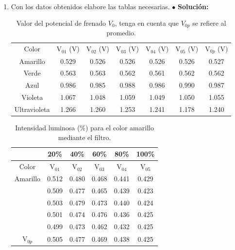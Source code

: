 \documentclass{article}
\begin{document}
\begin{enumerate}
    \item Con los datos obtenidos elabore las tablas necesarias.\newline
$\bullet$ \textbf{Solución: }

\begin{table}[h!]
    \centering
    \begin{tabular}{|c|c|c|c|c|c|c|}
    \hline
       Color  &  V$_{01}$ (V) & V$_{02}$ (V) & V$_{03}$ (V) & V$_{04}$ (V) & V$_{05}$ (V) & V$_{0p}$ (V)\\
       Amarillo  & 0.529 & 0.526 & 0.526 & 0.526 & 0.526 & 0.527 \\
       \hline
       Verde  & 0.563 & 0.563 & 0.562 & 0.561 & 0.562 & 0.562 \\
       \hline
       Azul  & 0.986 & 0.985 & 0.988 & 0.986 & 0.990 & 0.987 \\
       \hline
       Violeta  & 1.067 & 1.048 & 1.059 & 1.049 & 1.050 & 1.055 \\
       \hline
       Ultravioleta  & 1.266 & 1.260 & 1.253 & 1.241 & 1.178 & 1.240 \\
       \hline
    \end{tabular}
    \caption{Valor del potencial de frenado $V_{0}$, tenga en cuenta que $V_{0p}$ se refiere al promedio.}
    \label{tab:my_label}
\end{table}

\begin{table}[h!]
    \centering
    \begin{tabular}{|c|c|c|c|c|c|}
    \hline
        & 20\% & 40\% & 60\% & 80\% & 100\% \\
        \hline
       Color  &  V$_{01}$ & V$_{02}$ & V$_{03}$ & V$_{04}$ & V$_{05}$ \\
       \hline
       Amarillo & 0.512 & 0.480 & 0.468 & 0.441 & 0.429\\
       \hline
        & 0.509 & 0.477 & 0.465 & 0.439 & 0.423 \\
       \hline
        & 0.503 & 0.479 & 0.473 & 0.440 & 0.424\\
       \hline
        & 0.501 & 0.474 & 0.476 & 0.436 & 0.425  \\
       \hline
        & 0.499 & 0.473 & 0.462 & 0.432 & 0.425 \\
       \hline
       V$_{0p}$ & 0.505 & 0.477 & 0.469 & 0.438 & 0.425 \\
       \hline
    \end{tabular}
    \caption{Intensidad luminosa (\%) para el color amarillo mediante el filtro.}
    \label{tab:my_label}
\end{table}





\end{enumerate}
\end{document}

